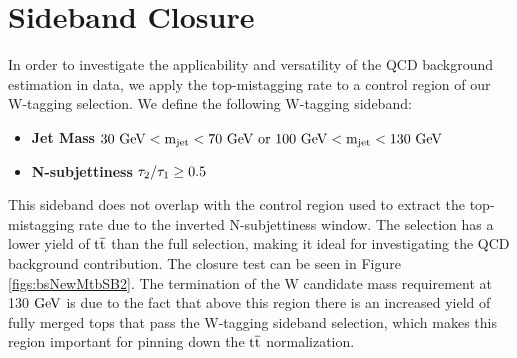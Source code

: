 \section{Sideband Closure}
\label{sec:bssecondsideband}
In order to investigate the applicability and versatility of the QCD background estimation in data, we apply the top-mistagging rate to a control region of our 
W-tagging selection.  We define the following W-tagging sideband:

\begin{itemize}
\item {\bf Jet Mass}  $\mathrm{\boldmath 30~\mathrm{GeV} < m_{\text{jet}} < 70~\mathrm{GeV}~or~100~\mathrm{GeV} < m_{\text{jet}} < 130~\mathrm{GeV} }$ 
\item {\bf N-subjettiness} $\mathrm{\boldmath \tau_2/\tau_1 \geq 0.5}$ 
\end{itemize}
This sideband does not overlap with the control region used to extract the top-mistagging rate due to the inverted N-subjettiness window.
The selection has a lower yield of $\mathrm{t\overline{t}}$ than the full selection, making it ideal for investigating the QCD background contribution.  
The closure test can be seen in Figure \ref{figs:bsNewMtbSB2}.  The termination of the W candidate mass requirement at 130 $\mathrm{GeV}$ is due to the fact that
above this region there is an increased yield of fully merged tops that pass the W-tagging sideband selection, which makes this region important for pinning 
down the $\mathrm{t\overline{t}}$ normalization.

